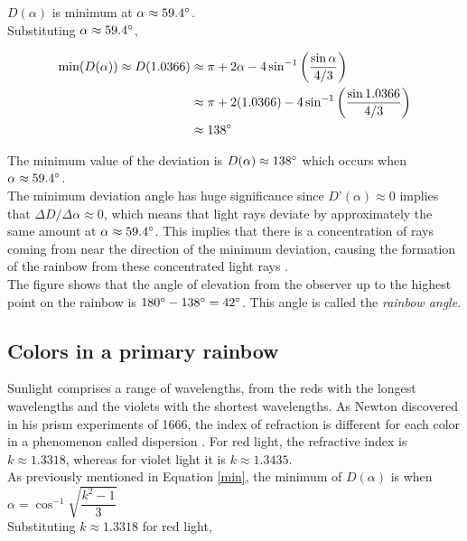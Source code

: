 \documentclass[a4paper,12pt]{article}
\begin{document}
$D(\alpha)$ is minimum at $\alpha \approx 59.4 \degree$.\\

Substituting $\alpha \approx  59.4 \degree$,

\begin{align*}
\min(D(\alpha)) \approx D(1.0366) &\approx \pi + 2\alpha - 4\sin^{-1} \left( \dfrac{\sin \alpha}{4/3} \right)\\
&\approx \pi + 2(1.0366) -  4\sin^{-1} \left( \dfrac{\sin 1.0366}{4/3} \right)\\
&\approx 138 \degree
\end{align*}

The minimum value of the deviation is $D(\alpha) \approx 138 \degree$ which occurs when $\alpha \approx 59.4 \degree$.\\

The minimum deviation angle has huge significance since $D’(\alpha) \approx 0$ implies that $\Delta D/\Delta \alpha \approx 0$, which means that light rays deviate by approximately the same amount at $\alpha \approx 59.4 \degree$. This implies that there is a concentration of rays coming from near the direction of the minimum deviation, causing the formation of the rainbow from these concentrated light rays \cite[219]{stewart21}.\\

The figure shows that the angle of elevation from the observer up to the highest point on the rainbow is $180 \degree - 138 \degree = 42 \degree$. This angle is called the {\itshape rainbow angle}.

\subsection{Colors in a primary rainbow} \label{sec:primarycolor}

Sunlight comprises a range of wavelengths, from the reds with the longest wavelengths and the violets with the shortest wavelengths. As Newton discovered in his prism experiments of
1666, the index of refraction is different for each color in a phenomenon called dispersion \cite[219]{stewart21}.
For red light, the refractive index is $k \approx 1.3318$, whereas for violet light it is $k \approx 1.3435$.\\

As previously mentioned in Equation \eqref{min}, the minimum of $D(\alpha)$ is when $\alpha = \cos^{-1} \sqrt{\dfrac{k^2 -1}{3}}$\\

Substituting $k \approx 1.3318$ for red light,
\end{document}
